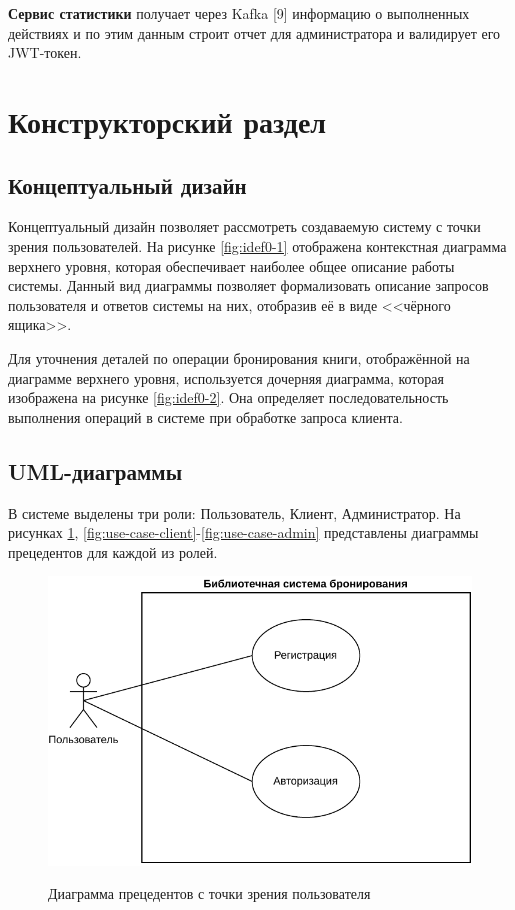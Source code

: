 \documentclass[a4paper, 12pt]{article}
\begin{document}
\begin{large}
\textbf{Сервис статистики} получает через Kafka [9] информацию о выполненных действиях и по этим данным строит отчет для администратора и валидирует его JWT-токен.

\newpage

\section{Конструкторский раздел}
\subsection{Концептуальный дизайн}
Концептуальный дизайн позволяет рассмотреть создаваемую систему с точки зрения пользователей. 
На рисунке \ref{fig:idef0-1} отображена контекстная диаграмма верхнего уровня, которая обеспечивает наиболее общее описание работы системы. 
Данный вид диаграммы позволяет формализовать описание запросов пользователя и ответов системы на них, отобразив её в виде <<чёрного ящика>>.

Для уточнения деталей по операции бронирования книги, отображённой на диаграмме верхнего уровня, используется дочерняя диаграмма, которая изображена на рисунке \ref{fig:idef0-2}. 
Она определяет последовательность выполнения операций в системе при обработке запроса клиента. 


\subsection{UML-диаграммы}
В системе выделены три роли: Пользователь, Клиент, Администратор. 
На рисунках \ref{fig:use-case-user}, \ref{fig:use-case-client}-\ref{fig:use-case-admin} представлены диаграммы прецедентов для каждой из ролей. 

\begin{figure}[h]
	\begin{center}
		{\includegraphics[scale = 1.1]{UseCaseUser}}
		\caption{Диаграмма прецедентов с точки зрения пользователя}
		\label{fig:use-case-user}
	\end{center}
\end{figure}


\end{large}
\end{document}

